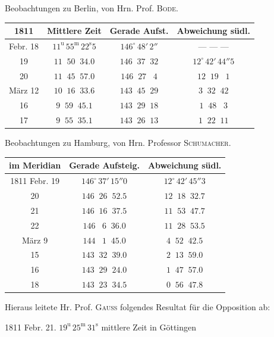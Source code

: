 \begin{center}\fontsize{10}{12}\selectfont\setlength{\tabcolsep}{4pt}\renewcommand{\arraystretch}{1.15}
Beobachtungen zu Berlin, von Hrn. Prof. \textsc{Bode}.

\begin{tabular}{c|c|c|c}
1811 & Mittlere Zeit & Gerade Aufst. & Abweichung südl. \\
\hline
Febr. 18 & $11^{\mathrm u}\,55^{\mathrm m}\,22^{\mathrm s}5$ & $146^\circ\,48'\,2''$ & --- --- --- \\
19 & $11\;\;50\;\;34.0$ & $146\;\;37\;\;32$ & $12^\circ\,42'\,44''5$ \\
20 & $11\;\;45\;\;57.0$ & $146\;\;27\;\;\;4$ & $12\;\;19\;\;\;1$ \\
März 12 & $10\;\;16\;\;33.6$ & $143\;\;45\;\;29$ & $3\;\;32\;\;42$ \\
16 & $9\;\;59\;\;45.1$ & $143\;\;29\;\;18$ & $1\;\;48\;\;\;3$ \\
17 & $9\;\;55\;\;35.1$ & $143\;\;26\;\;13$ & $1\;\;22\;\;11$ \\
\end{tabular}
\end{center}

\begin{center}\fontsize{10}{12}\selectfont\setlength{\tabcolsep}{4pt}\renewcommand{\arraystretch}{1.15}
Beobachtungen zu Hamburg, von Hrn. Professor \textsc{Schumacher}.

\begin{tabular}{c|c|c}
im Meridian & Gerade Aufsteig. & Abweichung südl. \\
\hline
1811 Febr. 19 & $146^\circ\,37'\,15''0$ & $12^\circ\,42'\,45''3$ \\
20 & $146\;\;26\;\;52.5$ & $12\;\;18\;\;32.7$ \\
21 & $146\;\;16\;\;37.5$ & $11\;\;53\;\;47.7$ \\
22 & $146\;\;\;6\;\;36.0$ & $11\;\;28\;\;53.5$ \\
März 9 & $144\;\;\;1\;\;45.0$ & $4\;\;52\;\;42.5$ \\
15 & $143\;\;32\;\;39.0$ & $2\;\;13\;\;59.0$ \\
16 & $143\;\;29\;\;24.0$ & $1\;\;47\;\;57.0$ \\
18 & $143\;\;23\;\;34.5$ & $0\;\;56\;\;47.8$ \\
\end{tabular}
\end{center}


\noindent Hieraus leitete Hr. Prof. \textsc{Gauss} folgendes Resultat für die Opposition ab:
\begin{center}1811 Febr. 21. $19^{\mathrm u}\,25^{\mathrm m}\,31^{\mathrm s}$ mittlere Zeit in Göttingen\end{center}

